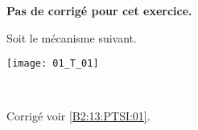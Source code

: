 \normaltrue
\correctionfalse


\setcounter{question}{0}
\ifcorrection
\else
\textbf{Pas de corrigé pour cet exercice.}
\fi

\ifprof
\else
Soit le mécanisme suivant. 
\begin{center}
\texttt{[image: 01\_T\_01]}
\end{center}
\fi

\ifprof~\\
\else
\fi




\ifprof
\else

\footnotesize

\normalsize

\begin{flushright}
\footnotesize{Corrigé  voir \ref{B2:13:PTSI:01}.}
\end{flushright}%
\fi



